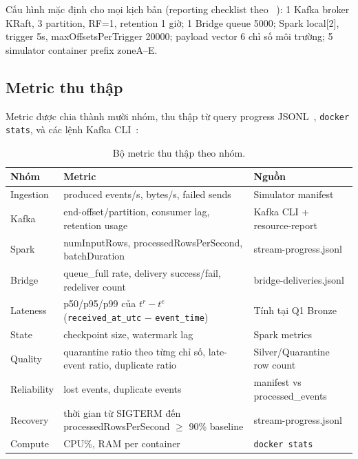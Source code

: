 Cấu hình mặc định cho mọi kịch bản (reporting checklist theo
~\cite{kafka_patterns_benchmark_2025}): 1 Kafka broker KRaft, 3 partition,
RF=1, retention 1 giờ; 1 Bridge queue 5000; Spark local{[}2{]}, trigger 5s,
maxOffsetsPerTrigger 20000; payload vector 6 chỉ số môi trường; 5 simulator
container prefix zoneA--E.

\subsection{Metric thu thập}

Metric được chia thành mười nhóm, thu thập từ query progress
JSONL~\cite{spark_docs_4_2}, \texttt{docker stats}, và các lệnh Kafka
CLI~\cite{kafka_docs_4_3}:

\begin{table}[H]
\centering
\caption{Bộ metric thu thập theo nhóm.}
\label{tab:metrics-results}
\footnotesize
\begin{tabularx}{\textwidth}{l X l}
\toprule
\textbf{Nhóm} & \textbf{Metric} & \textbf{Nguồn} \\
\midrule
Ingestion &
  produced events/s, bytes/s, failed sends &
  Simulator manifest \\
Kafka &
  end-offset/partition, consumer lag, retention usage &
  Kafka CLI + resource-report \\
Spark &
  numInputRows, processedRowsPerSecond, batchDuration &
  stream-progress.jsonl \\
Bridge &
  queue\_full rate, delivery success/fail, redeliver count &
  bridge-deliveries.jsonl \\
Lateness &
  p50/p95/p99 của $t^{r} - t^{e}$
  (\texttt{received\_at\_utc} $-$ \texttt{event\_time}) &
  Tính tại Q1 Bronze \\
State &
  checkpoint size, watermark lag &
  Spark metrics \\
Quality &
  quarantine ratio theo từng chỉ số, late-event ratio, duplicate ratio &
  Silver/Quarantine row count \\
Reliability &
  lost events, duplicate events &
  manifest vs processed\_events \\
Recovery &
  thời gian từ SIGTERM đến processedRowsPerSecond $\geq$ 90\% baseline &
  stream-progress.jsonl \\
Compute &
  CPU\%, RAM per container &
  \texttt{docker stats} \\
\bottomrule
\end{tabularx}
\end{table}

